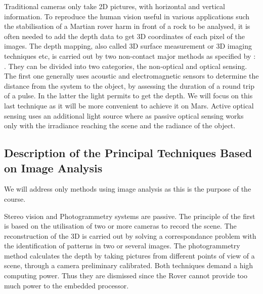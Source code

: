 Traditional cameras only take 2D pictures, with horizontal and vertical information. To reproduce the human vision useful in various applications such the stabilisation of a Martian rover harm in front of a rock to be analysed, it is often needed to add the depth data to get 3D coordinates of each pixel of the images. The depth mapping, also called 3D surface measurement or 3D imaging techniques etc, is carried out by two non-contact major methods as specified by \cite{sansoni2009state}: . They can be divided into two categories, the non-optical and optical sensing. The first one generally uses acoustic and electromagnetic sensors to determine the distance from the system to the object, by assessing the duration of a round trip of a pulse. In the latter the light permits to get the depth. We will focus on this last technique as it will be more convenient to achieve it on Mars. Active optical sensing uses an additional light source where as passive optical sensing works only with the irradiance reaching the scene and the radiance of the object. 

\subsection{Description of the Principal Techniques Based on Image Analysis}
We will address only methods using image analysis as this is the purpose of the course.

Stereo vision and Photogrammetry systems are passive. The principle of the first is based on the utilisation of two or more cameras to record the scene.  The reconstruction of the 3D is carried out by solving a correspondance problem with the identification of patterns in two or several images. The photogrammetry method calculates the depth by taking pictures from different points of view of a scene, through a camera preliminary calibrated. Both techniques demand a high computing power. Thus they are dismissed since the Rover cannot provide too much power to the embedded processor. 

